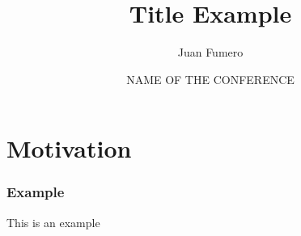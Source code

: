 \documentclass[t]{beamer}
\author[]{Juan Fumero}
\title[ ]{Title Example}
\institute{$^\dagger$The University of Manchester}
\date[CONF'18]{NAME OF THE CONFERENCE}
\begin{document}
\begin{frame}
    \titlepage
\end{frame}


\section{Motivation}

\begin{frame}[fragile]
	\frametitle{Example}
	This is an example
\end{frame}
\end{document}
